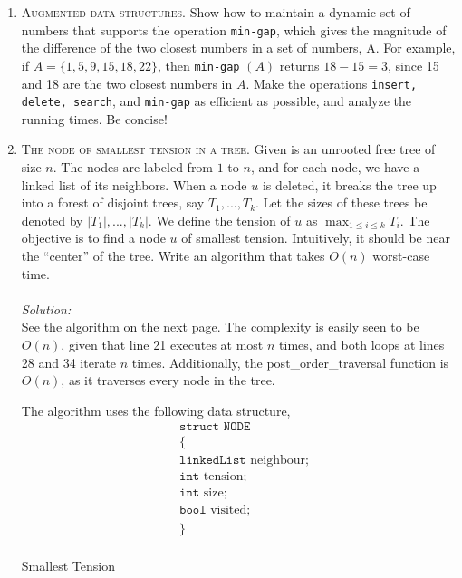 \documentclass[12pt]{article}
\theoremstyle{definition}
\theoremstyle{remark}
\newcommand\sol{%
  \\ 
  \\
  \textit{Solution:}\\%
}
\begin{document}
\begin{enumerate}
\begin{algorithm}
  \end{algorithm}
 \newpage 
  \item \textsc{Augmented data structures.} Show how to maintain a dynamic set of numbers that
supports the operation \texttt{min-gap}, which gives the magnitude of the difference of the two closest numbers in a set of numbers, A. For example, if $A = \{1, 5, 9, 15, 18, 22\}$, then \texttt{min-gap} $(A)$ returns $18 - 15 = 3$, since 15 and 18 are the two closest numbers in $A$. Make the operations \texttt{insert, delete, search}, and \texttt{min-gap} as efficient as possible, and analyze the running times. Be concise! 
\newpage 
\item \textsc{The node of smallest tension in a tree.} Given is an unrooted free tree of size $n$.
The nodes are labeled from $1$ to $n$, and for each node, we have a linked list of its neighbors. When a node $u$ is deleted, it breaks the tree up into a forest of disjoint trees, say $T_1, ... , T_k$. Let the sizes of these trees be denoted by $|T_1|,... , |T_k|$. We define the tension of $u$ as $\max_{1 \leq i \leq k} T_i$. The objective is to find a node $u$ of smallest tension. Intuitively, it should be near the “center” of the tree. Write an algorithm
that takes $O(n)$ worst-case time.
\sol 
See the algorithm on the next page. The complexity is easily seen to be $O(n)$, given that line 21 executes at most $n$ times, and both loops at lines 28 and 34 iterate $n$ times. Additionally, the post\_order\_traversal function is $O(n)$, as it traverses every node in the tree. 

The algorithm uses the following data structure, 
\begin{equation*}
  \begin{split}
    &\texttt{struct NODE}\\ 
    &\{\\ 
    &\texttt{linkedList } \text{neighbour}; \\ 
    &\texttt{int } \text{tension}; \\ 
    &\texttt{int } \text{size} ;\\ 
    &\texttt{bool }\text{visited}; \\
    &\}\\
  \end{split}
\end{equation*}

\begin{algorithm}
    \caption{Smallest Tension}


\end{algorithm}
\end{enumerate}
\end{document}

